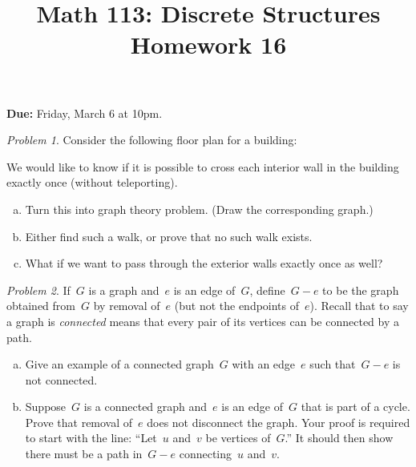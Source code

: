 \documentclass[11pt,twoside]{amsart}
\title{Math 113: Discrete Structures\\ Homework 16}
\theoremstyle{plain}
\theoremstyle{remark}
\newtheorem{prob}{Problem}
\theoremstyle{definition}
\theoremstyle{definition}
\begin{document}
\maketitle

\noindent
\textbf{Due:} Friday, March 6 at 10pm.
\bigskip

\begin{prob}
Consider the following floor plan for a building:

\begin{center}
\end{center}

We would like to know if it is possible to cross each interior wall in the building exactly once (without teleporting).

\begin{enumerate}[(a)]
  \item Turn this into graph theory problem. (Draw the corresponding graph.)
\item Either find such a walk, or prove that no such walk exists.
\item What if we want to pass through the exterior walls exactly once as well?
\end{enumerate}

\end{prob}

\begin{prob} 
  If~$G$ is a graph and~$e$ is an edge of~$G$, define~$G-e$ to be the graph
  obtained from~$G$ by removal of~$e$ (but not the endpoints of~$e$).
  Recall that to say a graph is {\em connected} means that every pair of its
  vertices can be connected by a path. 
  \begin{enumerate}[(a)]
    \item Give an example of a connected graph~$G$ with an edge~$e$ such
      that~$G-e$ is not connected.
    \item Suppose~$G$ is a connected graph and~$e$ is an edge of~$G$ that is
      part of a cycle.  Prove that removal of~$e$ does not disconnect the graph. 
      Your proof is required to start with the line: ``Let~$u$ and~$v$ be vertices
      of~$G$.'' It should then show there must be a path in~$G-e$ 
      connecting~$u$ and~$v$.
  \end{enumerate}
\end{prob}
\end{document}
